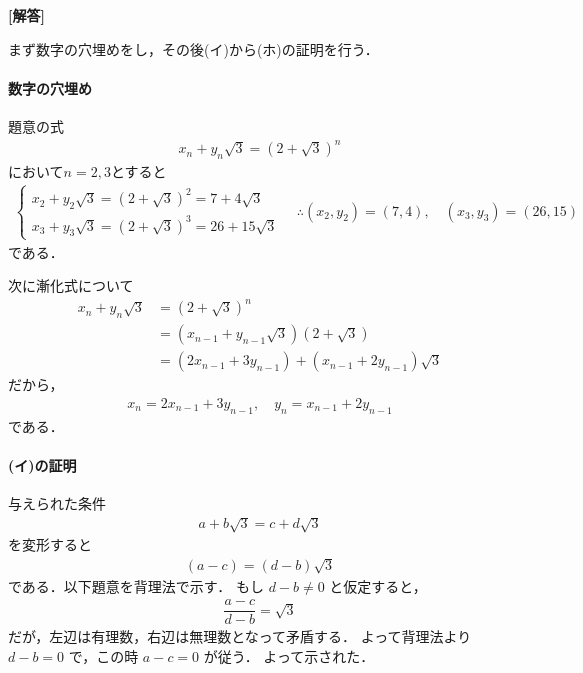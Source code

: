 \documentclass[../../main.tex]{subfiles}
\begin{document}
\begin{oframed}
  
\end{oframed}

{\bf [解答]}

まず数字の穴埋めをし，その後(イ)から(ホ)の証明を行う．

\paragraph{数字の穴埋め}

題意の式
\begin{align}
  x_n + y_n \sqrt{3} = (2+\sqrt{3})^n
\end{align}
において$n=2,3$とすると
\begin{align}
  \begin{cases}
    x_2 + y_2 \sqrt{3} = (2+\sqrt{3})^2 = 7 + 4\sqrt{3} \\
    x_3 + y_3 \sqrt{3} = (2+\sqrt{3})^3 = 26 + 15\sqrt{3}
  \end{cases}
  \quad \therefore
  (x_2, y_2) = (7, 4), \quad (x_3, y_3) = (26, 15)
\end{align}
である．

次に漸化式について
\begin{align}
  x_n + y_n \sqrt{3}
  & = (2+\sqrt{3})^n \\
  & = (x_{n-1}+y_{n-1}\sqrt{3})(2+\sqrt{3}) \\
  & = (2x_{n-1}+3y_{n-1}) + (x_{n-1}+2y_{n-1})\sqrt{3}
\end{align}
だから，
\begin{align}
  x_{n} = 2x_{n-1}+3y_{n-1},
  \quad
  y_{n} = x_{n-1}+2y_{n-1}
\end{align}
である．

\paragraph{(イ)の証明}

与えられた条件
\begin{align}
  a + b\sqrt{3} = c + d\sqrt{3}
\end{align}
を変形すると
\begin{align}
  (a-c) = (d-b)\sqrt{3}
\end{align}
である．以下題意を背理法で示す．
もし $d-b \neq 0$ と仮定すると，
\begin{align}
  \dfrac{a-c}{d-b} = \sqrt{3}
\end{align}
だが，左辺は有理数，右辺は無理数となって矛盾する．
よって背理法より $d-b=0$ で，この時 $a-c=0$ が従う．
よって示された．
\end{document}
